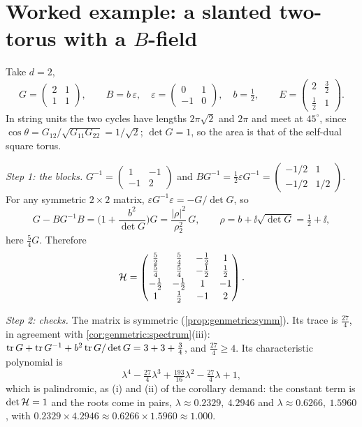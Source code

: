 \section{Worked example: a slanted two-torus with a \texorpdfstring{$B$}{B}-field}
\label{sec:genmetric:example}

Take $d=2$,
\[
 G=\begin{pmatrix}2&1\\1&1\end{pmatrix},\qquad
 B=b\,\varepsilon,\quad\varepsilon=\begin{pmatrix}0&1\\-1&0\end{pmatrix},\quad b=\tfrac12,
 \qquad E=\begin{pmatrix}2&\frac32\\[1pt]\frac12&1\end{pmatrix}.
\]
In string units the two cycles have lengths $2\pi\sqrt2$ and $2\pi$ and meet at
$45^\circ$, since $\cos\theta=G_{12}/\sqrt{G_{11}G_{22}}=1/\sqrt2$; $\det G=1$, so the area
is that of the self-dual square torus.

\emph{Step 1: the blocks.} $G^{-1}=\left(\begin{smallmatrix}1&-1\\-1&2\end{smallmatrix}
\right)$ and
$BG^{-1}=\tfrac12\varepsilon G^{-1}=\left(\begin{smallmatrix}-1/2&1\\-1/2&1/2
\end{smallmatrix}\right)$. For any symmetric $2\times2$ matrix,
$\varepsilon G^{-1}\varepsilon=-G/\det G$, so
\begin{equation}\label{eq:genmetric:d2block}
 G-BG^{-1}B=\Big(1+\frac{b^2}{\det G}\Big)G=\frac{|\rho|^2}{\rho_2^2}\,G,
 \qquad\rho=b+\ii\sqrt{\det G}=\tfrac12+\ii ,
\end{equation}
here $\frac54G$. Therefore
\begin{equation}\label{eq:genmetric:Hnum}
 \mathcal{H}=\begin{pmatrix}
 \frac52&\frac54&-\frac12&1\\[1pt]
 \frac54&\frac54&-\frac12&\frac12\\[1pt]
 -\frac12&-\frac12&1&-1\\[1pt]
 1&\frac12&-1&2\end{pmatrix}.
\end{equation}

\emph{Step 2: checks.} The matrix is symmetric (\cref{prop:genmetric:symm}). Its trace is
$\frac{27}4$, in agreement with \cref{cor:genmetric:spectrum}(iii):
$\operatorname{tr} G+\operatorname{tr} G^{-1}+b^2\operatorname{tr} G/\det G=3+3+\frac34$, and $\frac{27}4\ge4$. Its characteristic
polynomial is
\[
 \lambda^4-\tfrac{27}4\lambda^3+\tfrac{193}{16}\lambda^2-\tfrac{27}4\lambda+1,
\]
which is palindromic, as (i) and (ii) of the corollary demand: the constant term is
$\det\mathcal{H}=1$ and the roots come in pairs,
$\lambda\approx0.2329,\ 4.2946$ and $\lambda\approx0.6266,\ 1.5960$, with
$0.2329\times4.2946\approx0.6266\times1.5960\approx1.000$.

